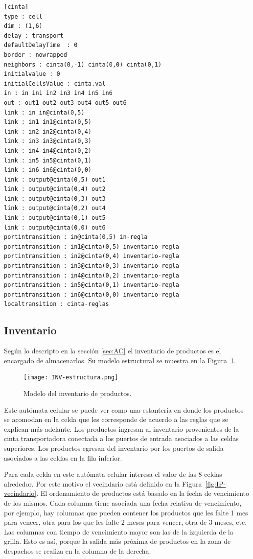 \documentclass[10pt]{article}
\begin{document}
\begin{minipage}{1\textwidth}
	\centering
	\begin{lstlisting}
[cinta]
type : cell
dim : (1,6)
delay : transport
defaultDelayTime  : 0
border : nowrapped
neighbors : cinta(0,-1) cinta(0,0) cinta(0,1)
initialvalue : 0
initialCellsValue : cinta.val
in : in in1 in2 in3 in4 in5 in6
out : out1 out2 out3 out4 out5 out6
link : in in@cinta(0,5)
link : in1 in1@cinta(0,5)
link : in2 in2@cinta(0,4)
link : in3 in3@cinta(0,3)
link : in4 in4@cinta(0,2)
link : in5 in5@cinta(0,1)
link : in6 in6@cinta(0,0)
link : output@cinta(0,5) out1
link : output@cinta(0,4) out2
link : output@cinta(0,3) out3
link : output@cinta(0,2) out4
link : output@cinta(0,1) out5
link : output@cinta(0,0) out6
portintransition : in@cinta(0,5) in-regla
portintransition : in1@cinta(0,5) inventario-regla
portintransition : in2@cinta(0,4) inventario-regla
portintransition : in3@cinta(0,3) inventario-regla
portintransition : in4@cinta(0,2) inventario-regla
portintransition : in5@cinta(0,1) inventario-regla
portintransition : in6@cinta(0,0) inventario-regla
localtransition : cinta-reglas
	\end{lstlisting}
\end{minipage}

\subsection{Inventario}\label{sec:IP}
Según lo descripto en la sección \ref{sec:AC} el inventario de productos es el encargado de almacenarlos. Su modelo estructural se muestra en la Figura~\ref{fig:IP-estructura}.

\begin{figure}[h] 
	\centering 
	\texttt{[image: INV-estructura.png]} 
	\caption{Modelo del inventario de productos.} 
	\label{fig:IP-estructura} 
\end{figure}

Este autómata celular se puede ver como una estantería en donde los productos se acomodan en la celda que les corresponde de acuerdo a las reglas que se explican más adelante. Los productos ingresan al inventario provenientes de la cinta transportadora conectada a los puertos de entrada asociados a las celdas superiores. Los productos egresan del inventario por los puertos de salida asociados a las celdas en la fila inferior.

Para cada celda en este autómata celular interesa el valor de las $8$ celdas alrededor. Por este motivo el vecindario está definido en la Figura~\ref{fig:IP-vecindario}. El ordenamiento de productos está basado en la fecha de vencimiento de los mismos. Cada columna tiene asociada una fecha relativa de vencimiento, por ejemplo, hay columnas que pueden contener los productos que les falte 1 mes para vencer, otra para los que les falte 2 meses para vencer, otra de 3 meses, etc. Las columnas con tiempo de vencimiento mayor son las de la izquierda de la grilla. Esto es así, porque la salida más próxima de productos en la zona de despachos se realiza en la columna de la derecha.
\end{document}
